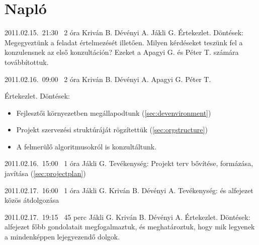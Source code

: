 %
\section{Napló}

\begin{naplo}

\bejegyzes
{2011.02.15.~21:30~}
{2 óra}
{Kriván B.\newline
Dévényi A.\newline
Jákli G.}
{Értekezlet.\newline
Döntések: Megegyeztünk a feladat értelme\-zését illetően.
Milyen kérdéseket teszünk fel a konzulensnek az első konzultáción?\newline
Ezeket a Apagyi G. és Péter T. számára továbbítottuk.}

\bejegyzes
{2011.02.16.~09:00~}
{2 óra}
{Kriván B.\newline
Dévényi A.\newline
Apagyi G.\newline
Péter T.}
{Értekezlet.\newline
Döntések:
\begin{itemize}
\setlength{\itemsep}{0cm}%
\setlength{\parskip}{0cm}%
\item Fejlesztői környezetben megállapodtunk (\ref{sec:devenvironment})
\item Projekt szervezési struktúráját rögzítettük (\ref{sec:orgstructure})
\item A felmerülő algoritmusokról is konzultáltunk.
\end{itemize}
}

\bejegyzes
{2011.02.16.~15:00~}
{1 óra}
{Jákli G.}
{Tevékenység: Projekt terv bővítése, formázá\-sa, javítása (\ref{sec:projectplan})}

\bejegyzes
{2011.02.17.~16:00~}
{1 óra}
{Jákli G.\newline
Kriván B.\newline
Dévényi A.}
{Tevékenység:  és  alfejezet közös átdolgozása}

\bejegyzes
{2011.02.17.~19:15~}
{45 perc}
{Jákli G.\newline
Kriván B.\newline
Dévényi A.}
{Értekezlet.\newline
Döntések:  alfejezet főbb gondolatait megfogalmaztuk, és meghatároztuk, hogy mik legyenek a mindenképpen lejegyezendő dolgok.}


\end{naplo}
